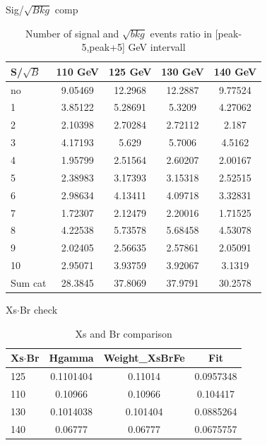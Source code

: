 \documentclass[10pt,UKenglish, leqno, xcolor = dvipsnames]{beamer}
\begin{document}
		\begin{frame}{Sig/$\sqrt{Bkg}$ comp}
			\vfill
			\begin{table}[tbp]
				\centering
				\begin{tabular}{lcccc}
					\toprule[1.5pt]
					S/$\sqrt{B}$& 110 GeV	& 125 GeV	& 130 GeV	& 140 GeV	\\
					\midrule
					no	& 9.05469	& 12.2968	& 12.2887	& 9.77524	\\
					1	& 3.85122	& 5.28691	& 5.3209	& 4.27062 	\\
					2	& 2.10398	& 2.70284	& 2.72112	& 2.187 	\\
					3	& 4.17193	& 5.629		& 5.7006	& 4.5162 	\\
					4	& 1.95799	& 2.51564	& 2.60207	& 2.00167 	\\
					5	& 2.38983	& 3.17393	& 3.15318	& 2.52515 	\\
					6	& 2.98634	& 4.13411	& 4.09718	& 3.32831 	\\
					7	& 1.72307	& 2.12479	& 2.20016	& 1.71525 	\\
					8	& 4.22538	& 5.73578	& 5.68458	& 4.53078 	\\
					9	& 2.02405	& 2.56635	& 2.57861	& 2.05091 	\\
					10	& 2.95071	& 3.93759	& 3.92067	& 3.1319 	\\
					Sum cat & 28.3845 	& 37.8069 	& 37.9791	& 30.2578 	\\
					
					
					\bottomrule[1.5pt]
				\end{tabular}
				\caption{Number of signal and $\sqrt{bkg}$ events ratio in [peak-5,peak+5] GeV intervall}
			\end{table}
			\vfill
		\end{frame}
	
		\begin{frame}{Xs$\cdot$Br check}
			\vfill
			\begin{table}[tbp]
				\centering
				\begin{tabular}{lccc}
					\toprule[1.5pt]
					Xs$\cdot$Br	& Hgamma	& Weight\_XsBrFe& Fit	\\
					\midrule
					125	& 0.1101404	& 0.11014	& 0.0957348	\\
					110 & 0.10966	& 0.10966	& 0.104417	\\
					130 & 0.1014038	& 0.101404	& 0.0885264	\\
					140 & 0.06777	& 0.06777	& 0.0675757	\\
					
					
					\bottomrule[1.5pt]
				\end{tabular}
				\caption{Xs and Br comparison}
			\end{table}
			\vfill
			
		\end{frame}
	
\end{document}
